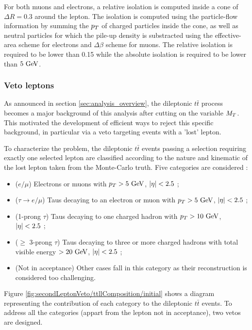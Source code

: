     For both muons and electrons, a relative isolation is computed inside a cone of
    $\Delta R = 0.3$ around the lepton. The isolation is computed using the particle-flow
    information by summing the $p_T$ of charged particles inside the cone, as well as
    neutral particles for which the pile-up density is substracted using the effective-area
    scheme for electrons and $\Delta \beta$ scheme for muons. The relative isolation is
    required to be lower than 0.15 while the absolute isolation is required to be lower
    than $5~\text{GeV}$.

        \subsubsection{Veto leptons \label{sec:vetoLeptons}}

    As announced in section \ref{sec:analysis_overview}, the dileptonic $t\bar{t}$
    process becomes a major background of this analysis after cutting on the variable $M_T$.
    This motivated the development of efficient ways to reject this specific background,
    in particular via a veto targeting events with a 'lost' lepton.

    To characterize the problem, the dileptonic $t\bar{t}$ events passing a selection
    requiring exactly one selected lepton are classified according to the nature and
    kinematic of the lost lepton taken from the Monte-Carlo truth. Five categories are considered :
    \begin{itemize}
        \item ($e/\mu$) Electrons or muons with $p_T > 5~\text{GeV}$, $\left| \eta \right| < 2.5$ ;
        \item ($\tau \rightarrow e/\mu$) Taus decaying to an electron or muon with $p_T > 5~\text{GeV}$, $\left| \eta \right| < 2.5$ ;
        \item (1-prong $\tau$) Taus decaying to one charged hadron with $p_T > 10~\text{GeV}$, $\left| \eta \right| < 2.5$ ;
        \item ($\geq$ 3-prong $\tau$) Taus decaying to three or more charged hadrons
              with total visible energy $> 20~\text{GeV}$, $\left| \eta \right| < 2.5$ ;
        \item (Not in acceptance) Other cases fall in this category as their reconstruction
              is considered too challenging.
    \end{itemize}

    Figure \ref{fig:secondLeptonVeto/ttllComposition/initial} shows a diagram representing
    the contribution of each category to the dileptonic $t\bar{t}$ events. To address all
    the categories (appart from the lepton not in acceptance), two vetos are designed.

